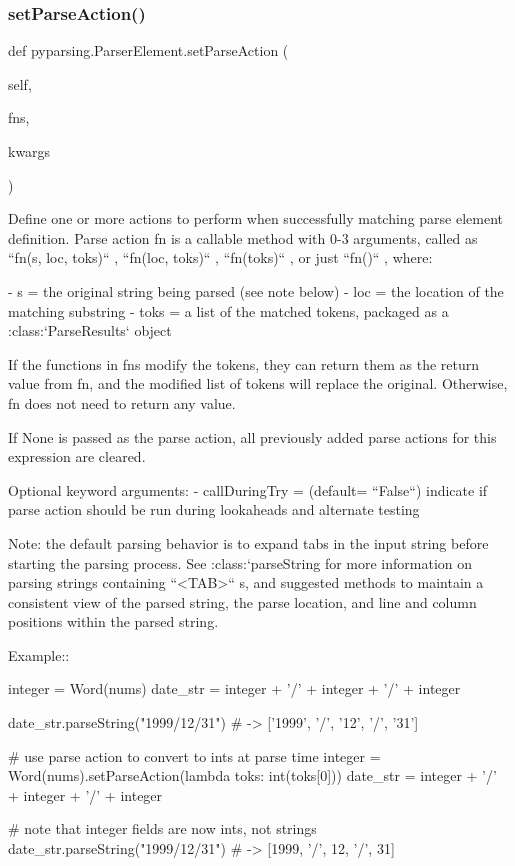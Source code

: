 \subsubsection{\texorpdfstring{set\+Parse\+Action()}{setParseAction()}}
{\footnotesize\ttfamily def pyparsing.\+Parser\+Element.\+set\+Parse\+Action (\begin{DoxyParamCaption}\item[{}]{self,  }\item[{}]{fns,  }\item[{}]{kwargs }\end{DoxyParamCaption})}

\begin{DoxyVerb}Define one or more actions to perform when successfully matching parse element definition.
Parse action fn is a callable method with 0-3 arguments, called as ``fn(s, loc, toks)`` ,
``fn(loc, toks)`` , ``fn(toks)`` , or just ``fn()`` , where:

- s   = the original string being parsed (see note below)
- loc = the location of the matching substring
- toks = a list of the matched tokens, packaged as a :class:`ParseResults` object

If the functions in fns modify the tokens, they can return them as the return
value from fn, and the modified list of tokens will replace the original.
Otherwise, fn does not need to return any value.

If None is passed as the parse action, all previously added parse actions for this
expression are cleared.

Optional keyword arguments:
- callDuringTry = (default= ``False``) indicate if parse action should be run during lookaheads and alternate testing

Note: the default parsing behavior is to expand tabs in the input string
before starting the parsing process.  See :class:`parseString for more
information on parsing strings containing ``<TAB>`` s, and suggested
methods to maintain a consistent view of the parsed string, the parse
location, and line and column positions within the parsed string.

Example::

    integer = Word(nums)
    date_str = integer + '/' + integer + '/' + integer

    date_str.parseString("1999/12/31")  # -> ['1999', '/', '12', '/', '31']

    # use parse action to convert to ints at parse time
    integer = Word(nums).setParseAction(lambda toks: int(toks[0]))
    date_str = integer + '/' + integer + '/' + integer

    # note that integer fields are now ints, not strings
    date_str.parseString("1999/12/31")  # -> [1999, '/', 12, '/', 31]
\end{DoxyVerb}
 \mbox{\label{classpyparsing_1_1ParserElement_a4996c883b285fef6c89b2b5caf675fd0}} 
